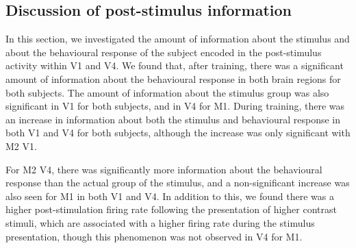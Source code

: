 

\subsection{Discussion of post-stimulus information}

In this section, we investigated the amount of information about the stimulus and about the behavioural response of the subject encoded in the post-stimulus activity within \ac{V1} and \ac{V4}.
We found that, after training, there was a significant amount of information about the behavioural response in both brain regions for both subjects.
The amount of information about the stimulus group was also significant in \ac{V1} for both subjects, and in \ac{V4} for \ac{M1}.
During training, there was an increase in information about both the stimulus and behavioural response in both \ac{V1} and \ac{V4} for both subjects, although the increase was only significant with \ac{M2} \ac{V1}.

For \ac{M2} \ac{V4}, there was significantly more information about the behavioural response than the actual group of the stimulus, and a non-significant increase was also seen for \ac{M1} in both \ac{V1} and \ac{V4}.
In addition to this, we found there was a higher post-stimulation firing rate following the presentation of higher contrast stimuli, which are associated with a higher firing rate during the stimulus presentation, though this phenomenon was not observed in \ac{V4} for \ac{M1}.

